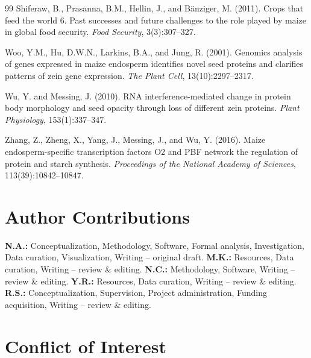 \documentclass[12pt,a4paper]{article}
\begin{document}
\begin{thebibliography}{99}
Shiferaw, B., Prasanna, B.M., Hellin, J., and B\"{a}nziger, M. (2011).
\newblock Crops that feed the world 6. Past successes and future challenges to the role played by maize in global food security.
\newblock \textit{Food Security}, 3(3):307--327.

Woo, Y.M., Hu, D.W.N., Larkins, B.A., and Jung, R. (2001).
\newblock Genomics analysis of genes expressed in maize endosperm identifies novel seed proteins and clarifies patterns of zein gene expression.
\newblock \textit{The Plant Cell}, 13(10):2297--2317.

Wu, Y. and Messing, J. (2010).
\newblock RNA interference-mediated change in protein body morphology and seed opacity through loss of different zein proteins.
\newblock \textit{Plant Physiology}, 153(1):337--347.

Zhang, Z., Zheng, X., Yang, J., Messing, J., and Wu, Y. (2016).
\newblock Maize endosperm-specific transcription factors O2 and PBF network the regulation of protein and starch synthesis.
\newblock \textit{Proceedings of the National Academy of Sciences}, 113(39):10842--10847.

\end{thebibliography}

\section*{Author Contributions}

\textbf{N.A.:} Conceptualization, Methodology, Software, Formal analysis, Investigation, Data curation, Visualization, Writing -- original draft.
\textbf{M.K.:} Resources, Data curation, Writing -- review \& editing.
\textbf{N.C.:} Methodology, Software, Writing -- review \& editing.
\textbf{Y.R.:} Resources, Data curation, Writing -- review \& editing.
\textbf{R.S.:} Conceptualization, Supervision, Project administration, Funding acquisition, Writing -- review \& editing.

\section*{Conflict of Interest}
\end{document}
